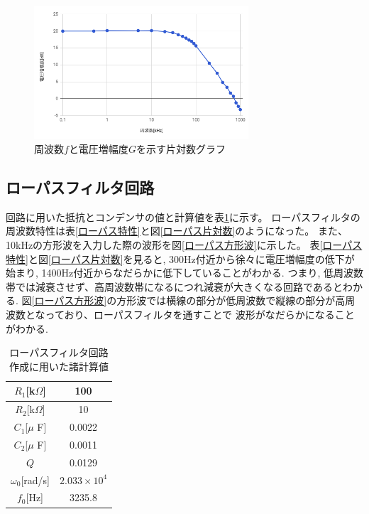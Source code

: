 \documentclass[a4paper,11pt,uplatex]{jsarticle}
\begin{document}
\begin{figure}[H]
	\begin{center}
		\includegraphics[width=8cm]{画像/片対数1.png}
		\caption{周波数$f$と電圧増幅度$G$を示す片対数グラフ}
		\label{片対数1}
	\end{center}
\end{figure}

\subsection{ローパスフィルタ回路}
回路に用いた抵抗とコンデンサの値と計算値を表\ref{ローパス計算}に示す。
ローパスフィルタの周波数特性は表\ref{ローパス特性}と図\ref{ローパス片対数}のようになった。
また、10kHzの方形波を入力した際の波形を図\ref{ローパス方形波}に示した。
表\ref{ローパス特性}と図\ref{ローパス片対数}を見ると, 300Hz付近から徐々に電圧増幅度の低下が始まり,
1400Hz付近からなだらかに低下していることがわかる. つまり, 低周波数帯では減衰させず、高周波数帯になるにつれ減衰が大きくなる回路であるとわかる.
図\ref{ローパス方形波}の方形波では横線の部分が低周波数で縦線の部分が高周波数となっており、ローパスフィルタを通すことで
波形がなだらかになることがわかる.
\begin{table}[H]
	\caption{ローパスフィルタ回路作成に用いた諸計算値}
	\label{ローパス計算}
	\begin{center}
    \begin{tabular}[H]{|c|c|}\hline
      $R_1$[k$\Omega$] & 100 \\ \hline
      $R_2$[k$\Omega$] & 10\\ \hline
      $C_1$[$\mu$ F] & 0.0022\\ \hline
      $C_2$[$\mu$ F] & 0.0011\\ \hline
      $Q$ & 0.0129 \\ \hline
      $\omega_0$[rad/s] & $2.033 \times 10^4$ \\ \hline
      $f_0$[Hz] & 3235.8\\ \hline
    \end{tabular}
\end{center}
\end{table}
\end{document}
